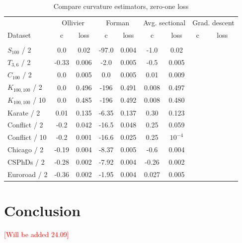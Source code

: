 \documentclass{article} %
\begin{document}
\begin{table}[t]
\caption{Compare curvature estimators, zero-one loss}
\label{tab:compare_zero_one}
\begin{center}
\begin{tabular}{lcccccccc}
&
\multicolumn{2}{c}{Ollivier} &
\multicolumn{2}{c}{Forman} &
\multicolumn{2}{c}{Avg. sectional} &
\multicolumn{2}{c}{Grad. descent} 
\\
Dataset & c & loss  & c & loss  & c & loss & c & loss  
\\
\hline \\
$S_{100}$ / 2 &
0.0 & 0.02 & 
-97.0 & 0.004 & 
-1.0 & 0.02 &
&
\\
$T_{3,6}$ / 2 &
-0.33 & 0.006 & 
-2.0 & 0.005 & 
-0.5 & 0.005 & 
&
\\
$C_{100}$ / 2 & 
0.0 & 0.005 & 
0.0 & 0.005 &
0.01 & 0.009 & 
&
\\
$K_{100,100}$ / 2 &
0.0 & 0.496 & 
-196 & 0.491 & 
0.008 & 0.497 & 
&
\\
$K_{100,100}$ / 10 &
0.0 & 0.485 & 
-196 & 0.492 & 
0.008 & 0.480 & 
&
\\
Karate / 2 &
0.01 & 0.135 & 
-6.35 & 0.137 &
0.30 & 0.123 &
&
\\
Conflict / 2 &
-0.2 & 0.042 &
-16.5 &	0.048 &
0.25 & 0.059 &
& \\
Conflict / 10 &
-0.2 & 0.001 &
-16.6 &	0.025 &
0.25 & $10^{-4}$
& \\
Chicago / 2 &
-0.19 & 0.004 & 
-8.37 & 0.005 & 
-0.6 & 0.004 & 
& \\
CSPhDs / 2 &
-0.28 &	0.002 &
-7.92 &	0.004 &
-0.26 & 0.002 &
& \\
Euroroad / 2 &
-0.36 &	0.002 &
-1.95 &	0.004 &
0.027 &	0.005 &
& \\
\end{tabular}
\end{center}
\end{table}

\section{Conclusion}

\textcolor{red}{[Will be added 24.09]}

\end{document}
